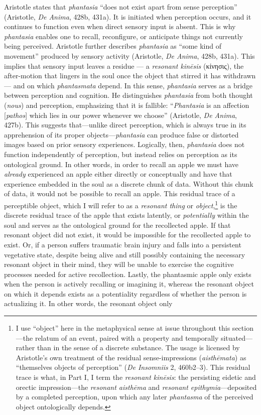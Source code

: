 \documentclass{article}
\newcommand{\gk}[1]{{\greekfont #1}}
\begin{document}
Aristotle states that \textit{phantasia} ``does not exist apart from sense perception'' (Aristotle, \textit{De Anima}, 428b, 431a). It is initiated when perception occurs, and it continues to function even when direct sensory input is absent. This is why \textit{phantasia} enables one to recall, reconfigure, or anticipate things not currently being perceived. Aristotle further describes \textit{phantasia} as ``some kind of movement'' produced by sensory activity (Aristotle, \textit{De Anima}, 428b, 431a). This implies that sensory input leaves a residue — a \textit{resonant kinēsis} (\gk{κίνησις}), the after-motion that lingers in the soul once the object that stirred it has withdrawn — and on which \textit{phantasmata} depend. In this sense, \textit{phantasia} serves as a bridge between perception and cognition. He distinguishes \textit{phantasia} from both thought (\textit{nous}) and perception, emphasizing that it is fallible: ``\textit{Phantasia} is an affection [\textit{pathos}] which lies in our power whenever we choose'' (Aristotle, \textit{De Anima}, 427b). This suggests that—unlike direct perception, which is always true in its apprehension of its proper objects—\textit{phantasia} can produce false or distorted images based on prior sensory experiences. Logically, then, \textit{phantasia} does not function independently of perception, but instead relies on perception as its ontological ground. In other words, in order to recall an apple we must have \textit{already} experienced an apple either directly or conceptually and have that experience embedded in the soul as a discrete chunk of data. Without this chunk of data, it would not be possible to recall an apple. This residual trace of a perceptible object, which I will refer to as a \textit{resonant thing} or \textit{object},\footnote{I use ``object'' here in the metaphysical sense at issue throughout this section—the relatum of an event, paired with a property and temporally situated—rather than in the sense of a discrete substance. The usage is licensed by Aristotle's own treatment of the residual sense-impressions (\textit{aisthēmata}) as ``themselves objects of perception'' (\textit{De Insomniis} 2, 460b2–3). This residual trace is what, in Part I, I term the \textit{resonant kinēsis}: the persisting eidetic and orectic impression—the \textit{resonant aisthēma} and \textit{resonant epithymia}—deposited by a completed perception, upon which any later \textit{phantasma} of the perceived object ontologically depends.} is the discrete residual trace of the apple that exists latently, or \textit{potentially} within the soul and serves as the ontological ground for the recollected apple. If that resonant object did not exist, it would be impossible for the recollected apple to exist. Or, if a person suffers traumatic brain injury and falls into a persistent vegetative state, despite being alive and still possibly containing the necessary resonant object in their mind, they will be unable to exercise the cognitive processes needed for active recollection. Lastly, the phantasmic apple only exists when the person is actively recalling or imagining it, whereas the resonant object on which it depends exists as a potentiality regardless of whether the person is actualizing it. In other words, the resonant object only 
\end{document}
